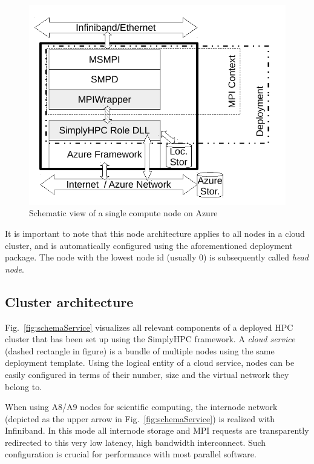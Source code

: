 \documentclass[3p,times]{elsarticle}
\begin{document}
\begin{figure}[h]
	\centering
	\includegraphics[width=.5\linewidth]{azureWorkerRole.pdf}
	\caption{Schematic view of a single compute node on Azure}

	\label{fig:schemaRole}
\end{figure}

It is important to note that this node architecture applies to all nodes in a cloud cluster, and is automatically configured using the aforementioned deployment package. The node with the lowest node id (usually 0) is subsequently called \textit{head node}.


\subsection{Cluster architecture}

Fig.~\ref{fig:schemaService} visualizes all relevant components of a deployed HPC cluster that has been set up using the SimplyHPC framework. 
A \textit{cloud service} (dashed rectangle in figure) is a bundle of multiple nodes using the same deployment template. Using the logical entity of a cloud service, nodes can be easily configured in terms of their number, size and the virtual network they belong to. 

When using A8/A9 nodes for scientific computing, the internode network (depicted as the upper arrow in Fig.~\ref{fig:schemaService}) is realized with Infiniband. In this mode all internode storage and MPI requests are transparently redirected to this very low latency, high bandwidth interconnect. Such configuration is crucial for performance with most parallel software.
\end{document}
